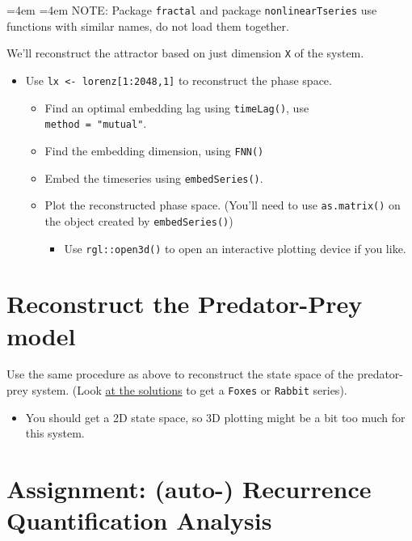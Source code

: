 \documentclass[]{book}
\providecommand{\tightlist}{%
  \setlength{\itemsep}{0pt}\setlength{\parskip}{0pt}}
\renewenvironment{quote}{%
  \par \small \medskip \block
  \leftskip=4em \rightskip=4em%
  \noindent \ignorespaces}{%
  \par \medskip
  }
\let\stdsection\section
\renewcommand\section{\newpage\stdsection}
\begin{document}
\begin{quote}
NOTE: Package \texttt{fractal} and package \texttt{nonlinearTseries} use
functions with similar names, do not load them together.
\end{quote}

We'll reconstruct the attractor based on just dimension \texttt{X} of
the system.

\begin{itemize}
\tightlist
\item
  Use \texttt{lx\ \textless{}-\ lorenz{[}1:2048,1{]}} to reconstruct the
  phase space.

  \begin{itemize}
  \tightlist
  \item
    Find an optimal embedding lag using \texttt{timeLag()}, use
    \texttt{method\ =\ "mutual"}.
  \item
    Find the embedding dimension, using \texttt{FNN()}
  \item
    Embed the timeseries using \texttt{embedSeries()}.
  \item
    Plot the reconstructed phase space. (You'll need to use
    \texttt{as.matrix()} on the object created by
    \texttt{embedSeries()})

    \begin{itemize}
    \tightlist
    \item
      Use \texttt{rgl::open3d()} to open an interactive plotting device
      if you like.
    \end{itemize}
  \end{itemize}
\end{itemize}

\section{Reconstruct the Predator-Prey
model}\label{reconstruct-the-predator-prey-model}

Use the same procedure as above to reconstruct the state space of the
predator-prey system. (Look \protect\hyperlink{ppdsol}{at the solutions}
to get a \texttt{Foxes} or \texttt{Rabbit} series).

\begin{itemize}
\tightlist
\item
  You should get a 2D state space, so 3D plotting might be a bit too
  much for this system.
\end{itemize}

\section{Assignment: (auto-) Recurrence Quantification
Analysis}\label{assignment-auto--recurrence-quantification-analysis}
\end{document}
